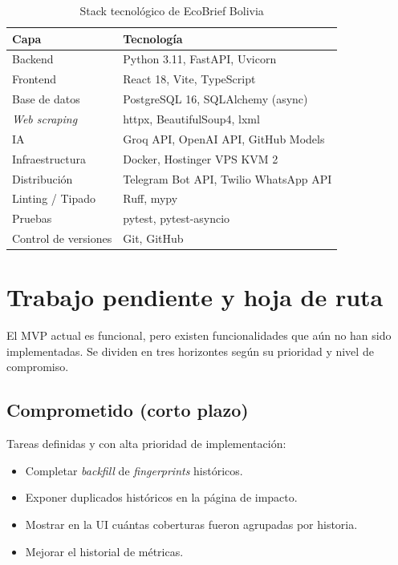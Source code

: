 \begin{table}[H]
\centering
\begin{tabular}{ll}
\toprule
\textbf{Capa} & \textbf{Tecnolog\'ia} \\
\midrule
Backend & Python 3.11, FastAPI, Uvicorn \\
Frontend & React 18, Vite, TypeScript \\
Base de datos & PostgreSQL 16, SQLAlchemy (async) \\
\textit{Web scraping} & httpx, BeautifulSoup4, lxml \\
IA & Groq API, OpenAI API, GitHub Models \\
Infraestructura & Docker, Hostinger VPS KVM 2 \\
Distribuci\'on & Telegram Bot API, Twilio WhatsApp API \\
Linting / Tipado & Ruff, mypy \\
Pruebas & pytest, pytest-asyncio \\
Control de versiones & Git, GitHub \\
\bottomrule
\end{tabular}
\caption{Stack tecnol\'ogico de EcoBrief Bolivia}
\end{table}

\section{Trabajo pendiente y hoja de ruta}

El MVP actual es funcional, pero existen funcionalidades que a\'un no han sido implementadas. Se dividen en tres horizontes seg\'un su prioridad y nivel de compromiso.

\subsection{Comprometido (corto plazo)}

Tareas definidas y con alta prioridad de implementaci\'on:

\begin{itemize}[nosep]
    \item Completar \textit{backfill} de \textit{fingerprints} hist\'oricos.
    \item Exponer duplicados hist\'oricos en la p\'agina de impacto.
    \item Mostrar en la UI cu\'antas coberturas fueron agrupadas por historia.
    \item Mejorar el historial de m\'etricas.
\end{itemize}

